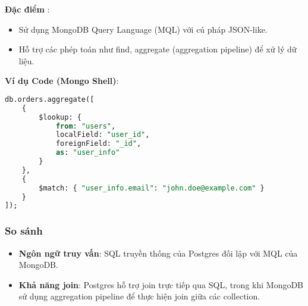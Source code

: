 \textbf{Đặc điểm} : 
\begin{itemize}
    \item Sử dụng MongoDB Query Language (MQL) với cú pháp JSON-like.
    \item Hỗ trợ các phép toán như find, aggregate (aggregation pipeline) để xử lý dữ liệu.
\end{itemize}

\textbf{Ví dụ Code (Mongo Shell)}:

\begin{lstlisting}[language=sql]
db.orders.aggregate([
    {
        $lookup: {
            from: "users",
            localField: "user_id",
            foreignField: "_id",
            as: "user_info"
        }
    },
    {
        $match: { "user_info.email": "john.doe@example.com" }
    }
]);
\end{lstlisting}

\subsubsection{So sánh}

\begin{itemize}
    \item \textbf{Ngôn ngữ truy vấn}: SQL truyền thống của Postgres đối lập với MQL của MongoDB.
    \item \textbf{Khả năng join}: Postgres hỗ trợ join trực tiếp qua SQL, trong khi MongoDB sử dụng aggregation pipeline để thực hiện join giữa các collection.
\end{itemize}